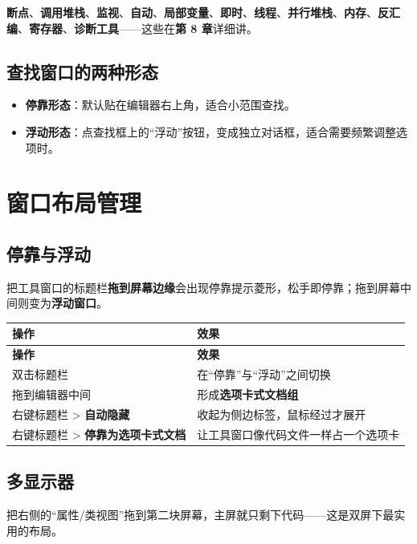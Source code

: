 \textbf{断点}、\textbf{调用堆栈}、\textbf{监视}、\textbf{自动}、\textbf{局部变量}、\textbf{即时}、\textbf{线程}、\textbf{并行堆栈}、\textbf{内存}、\textbf{反汇编}、\textbf{寄存器}、\textbf{诊断工具}——这些在\textbf{第 8 章}详细讲。

\subsection{查找窗口的两种形态}

\begin{itemize}
	\item \textbf{停靠形态}：默认贴在编辑器右上角，适合小范围查找。
	\item \textbf{浮动形态}：点查找框上的“浮动”按钮，变成独立对话框，适合需要频繁调整选项时。
\end{itemize}

\section{窗口布局管理}

\subsection{停靠与浮动}

把工具窗口的标题栏\textbf{拖到屏幕边缘}会出现停靠提示菱形，松手即停靠；拖到屏幕中间则变为\textbf{浮动窗口}。

\begin{longtable}{L{6.2cm}L{8.8cm}}\toprule
\textbf{操作} & \textbf{效果} \\ \midrule \endfirsthead
\toprule \textbf{操作} & \textbf{效果} \\ \midrule \endhead
\bottomrule \endlastfoot
双击标题栏 & 在“停靠”与“浮动”之间切换 \\
拖到编辑器中间 & 形成\textbf{选项卡式文档组} \\
右键标题栏 > \textbf{自动隐藏} & 收起为侧边标签，鼠标经过才展开 \\
右键标题栏 > \textbf{停靠为选项卡式文档} & 让工具窗口像代码文件一样占一个选项卡 \\
\end{longtable}

\subsection{多显示器}

把右侧的“属性/类视图”拖到第二块屏幕，主屏就只剩下代码——这是双屏下最实用的布局。

